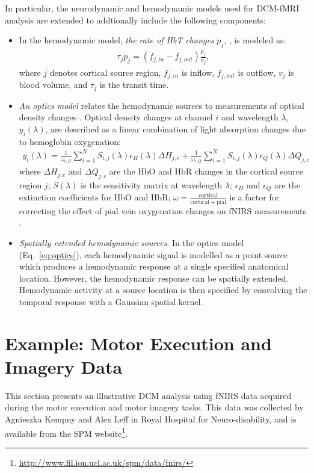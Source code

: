 In particular, the neurodynamic and hemodynamic models used for DCM-fMRI analysis \cite{dcm} are extended to addtionally include the following components:
\begin{itemize} 
\item In the hemodynamic model, \emph{the rate of HbT changes} $\dot{p}_j$, \cite{cui10}, is modeled as:
\begin{eqnarray} 
\tau_j \dot{p}_j  =  \left(f_{j,in} - f_{j,out}\right)\frac{p_j}{v_j},
\end{eqnarray}
where $j$ denotes cortical source region, $f_{j,in}$ is inflow, $f_{j,out}$ is outflow, $v_j$ is blood volume, and $\tau_j$ is the transit time. 

\item \emph{An optics model} relates the hemodynamic sources to measurements of optical density changes \cite{delpy1988estimation, arridge1999optical}. Optical density changes at channel $i$ and wavelength $\lambda$, $y_i(\lambda)$, are described as a linear combination of light absorption changes due to hemoglobin oxygenation: 
\begin{eqnarray}\label{eq:optics} 
y_i (\lambda) = \frac{1}{\omega_{i,H}} \sum_{i=1}^{N} S_{i,j}(\lambda)\epsilon_H(\lambda) \Delta H_{j,c} +  \frac{1}{\omega_{i,Q}} \sum_{i=1}^{N} S_{i,j}(\lambda)\epsilon_Q(\lambda) \Delta Q_{j,c}
\end{eqnarray} 
where $\Delta H_{j,c}$ and $\Delta Q_{j,c}$ are the HbO and HbR changes in the cortical source region $j$; $S(\lambda)$ is the sensitivity matrix at wavelength $\lambda$; $\epsilon_H$ and $\epsilon_Q$ are the extinction coefficients for HbO and HbR; $\omega = \frac{\mathrm{cortical}}{\mathrm{cortical} + \mathrm{pial}}$ is a factor for correcting the effect of pial vein oxygenation changes on fNIRS measurements  \cite{gagnon2012quantification}. 

\item \emph{Spatially extended hemodynamic sources}. In the optics model (Eq.~\ref{eq:optics}), each hemodynamic signal is modelled as a point source which produces a hemodynamic response at a single specified anatomical location. However, the hemodynamic response can be spatially extended. Hemodynamic activity at a source location is then specified by convolving the temporal response with a Gaussian spatial kernel.

\end{itemize} 

\section{Example: Motor Execution and Imagery Data} 
This section presents an illustrative DCM analysis using fNIRS data acquired during the motor execution and motor imagery tasks. This data was collected by Agnieszka Kempny and Alex Leff in Royal Hospital for Neuro-disability, and is available from the SPM website\footnote{\url{http://www.fil.ion.ucl.ac.uk/spm/data/fnirs/}}.

